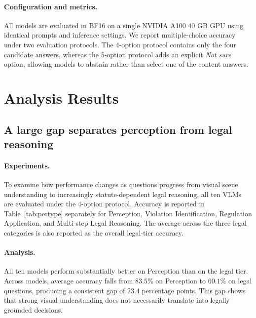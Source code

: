 \paragraph{Configuration and metrics.}
All models are evaluated in BF16 on a single NVIDIA A100 40 GB GPU using identical prompts and inference settings. We report multiple-choice accuracy under two evaluation protocols. The 4-option protocol contains only the four candidate answers, whereas the 5-option protocol adds an explicit \textit{Not sure} option, allowing models to abstain rather than select one of the content answers.

\section{Analysis Results}
\label{sec:results}

\subsection{A large gap separates perception from legal reasoning}
\label{sec:gap}
\paragraph{Experiments.} To examine how performance changes as questions progress from visual scene understanding to increasingly statute-dependent legal reasoning, all ten VLMs are evaluated under the 4-option protocol. Accuracy is reported in Table~\ref{tab:pertype} separately for Perception, Violation Identification, Regulation Application, and Multi-step Legal Reasoning. The average across the three legal categories is also reported as the overall legal-tier accuracy.
\paragraph{Analysis.}
All ten models perform substantially better on Perception than on the legal tier. Across models, average accuracy falls from $83.5\%$ on Perception to $60.1\%$ on legal questions, producing a consistent gap of $23.4$ percentage points. This gap shows that strong visual understanding does not necessarily translate into legally grounded decisions.

